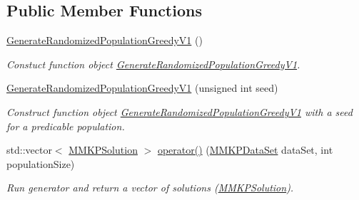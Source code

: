 \subsection*{Public Member Functions}
\begin{DoxyCompactItemize}
\item 
\hypertarget{class_generate_randomized_population_greedy_v1_a8b319a423128a1871a1874fdadbd8573}{\hyperlink{class_generate_randomized_population_greedy_v1_a8b319a423128a1871a1874fdadbd8573}{Generate\+Randomized\+Population\+Greedy\+V1} ()}\label{class_generate_randomized_population_greedy_v1_a8b319a423128a1871a1874fdadbd8573}

\begin{DoxyCompactList}\small\item\em Constuct function object \hyperlink{class_generate_randomized_population_greedy_v1}{Generate\+Randomized\+Population\+Greedy\+V1}. \end{DoxyCompactList}\item 
\hypertarget{class_generate_randomized_population_greedy_v1_a31f380a168ce525bd6f70c54730ab3da}{\hyperlink{class_generate_randomized_population_greedy_v1_a31f380a168ce525bd6f70c54730ab3da}{Generate\+Randomized\+Population\+Greedy\+V1} (unsigned int seed)}\label{class_generate_randomized_population_greedy_v1_a31f380a168ce525bd6f70c54730ab3da}

\begin{DoxyCompactList}\small\item\em Construct function object \hyperlink{class_generate_randomized_population_greedy_v1}{Generate\+Randomized\+Population\+Greedy\+V1} with a seed for a predicable population. \end{DoxyCompactList}\item 
\hypertarget{class_generate_randomized_population_greedy_v1_af39358dbec454c105e04a792df3524d7}{std\+::vector$<$ \hyperlink{class_m_m_k_p_solution}{M\+M\+K\+P\+Solution} $>$ \hyperlink{class_generate_randomized_population_greedy_v1_af39358dbec454c105e04a792df3524d7}{operator()} (\hyperlink{class_m_m_k_p_data_set}{M\+M\+K\+P\+Data\+Set} data\+Set, int population\+Size)}\label{class_generate_randomized_population_greedy_v1_af39358dbec454c105e04a792df3524d7}

\begin{DoxyCompactList}\small\item\em Run generator and return a vector of solutions (\hyperlink{class_m_m_k_p_solution}{M\+M\+K\+P\+Solution}). \end{DoxyCompactList}\end{DoxyCompactItemize}


